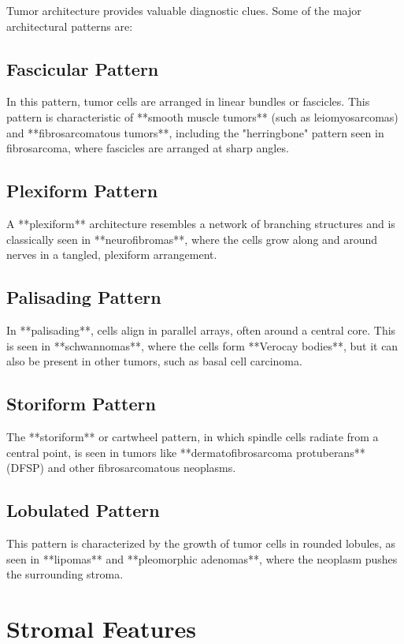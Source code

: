 Tumor architecture provides valuable diagnostic clues. Some of the major architectural patterns are:

\subsection{Fascicular Pattern}
In this pattern, tumor cells are arranged in linear bundles or fascicles. This pattern is characteristic of **smooth muscle tumors** (such as leiomyosarcomas) and **fibrosarcomatous tumors**, including the "herringbone" pattern seen in fibrosarcoma, where fascicles are arranged at sharp angles.

\subsection{Plexiform Pattern}
A **plexiform** architecture resembles a network of branching structures and is classically seen in **neurofibromas**, where the cells grow along and around nerves in a tangled, plexiform arrangement.

\subsection{Palisading Pattern}
In **palisading**, cells align in parallel arrays, often around a central core. This is seen in **schwannomas**, where the cells form **Verocay bodies**, but it can also be present in other tumors, such as basal cell carcinoma.

\subsection{Storiform Pattern}
The **storiform** or cartwheel pattern, in which spindle cells radiate from a central point, is seen in tumors like **dermatofibrosarcoma protuberans** (DFSP) and other fibrosarcomatous neoplasms.

\subsection{Lobulated Pattern}
This pattern is characterized by the growth of tumor cells in rounded lobules, as seen in **lipomas** and **pleomorphic adenomas**, where the neoplasm pushes the surrounding stroma.

\section{Stromal Features}


